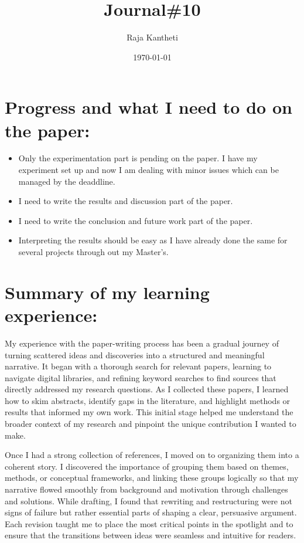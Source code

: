 \documentclass{article}[10pt]
\title{Journal\#10}
\author{Raja Kantheti}
\date{\today}
\begin{document}
\maketitle
\section*{Progress and what I need to do on the paper:}
\begin{itemize}
    \item Only the experimentation part is pending on the paper. I have my experiment set up and now I am dealing with minor issues which can be managed by the deaddline. 
    \item I need to write the results and discussion part of the paper.
    \item I need to write the conclusion and future work part of the paper.
    \item Interpreting the results should be easy as I have already done the same for several projects through out my Master's.
\end{itemize}
\section*{Summary of my learning experience: }
My experience with the paper-writing process has been a gradual journey of turning scattered ideas and discoveries into a structured and meaningful narrative. It began with a thorough search for relevant papers, learning to navigate digital libraries, and refining keyword searches to find sources that directly addressed my research questions. As I collected these papers, I learned how to skim abstracts, identify gaps in the literature, and highlight methods or results that informed my own work. This initial stage helped me understand the broader context of my research and pinpoint the unique contribution I wanted to make.

Once I had a strong collection of references, I moved on to organizing them into a coherent story. I discovered the importance of grouping them based on themes, methods, or conceptual frameworks, and linking these groups logically so that my narrative flowed smoothly from background and motivation through challenges and solutions. While drafting, I found that rewriting and restructuring were not signs of failure but rather essential parts of shaping a clear, persuasive argument. Each revision taught me to place the most critical points in the spotlight and to ensure that the transitions between ideas were seamless and intuitive for readers.
\end{document}
